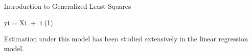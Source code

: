 Introduction to Generalized Least Squares

yi = Xi + i (1)

Estimation under this model has been studied extensively in the linear regression
model.
